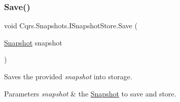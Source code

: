 \subsubsection{\texorpdfstring{Save()}{Save()}}
{\footnotesize\ttfamily void Cqrs.\+Snapshots.\+I\+Snapshot\+Store.\+Save (\begin{DoxyParamCaption}\item[{\hyperlink{classCqrs_1_1Snapshots_1_1Snapshot}{Snapshot}}]{snapshot }\end{DoxyParamCaption})}



Saves the provided {\itshape snapshot}  into storage. 


\begin{DoxyParams}{Parameters}
{\em snapshot} & the \hyperlink{classCqrs_1_1Snapshots_1_1Snapshot}{Snapshot} to save and store.\\
\hline
\end{DoxyParams}
